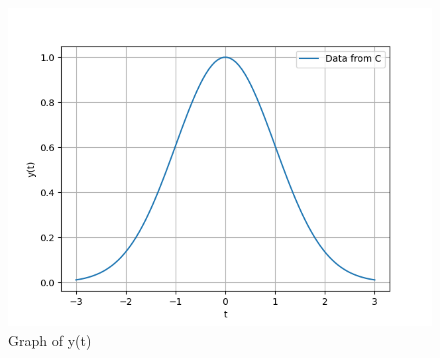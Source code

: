 \documentclass[journal,12pt,twocolumn]{IEEEtran}
\theoremstyle{remark}
\begin{document}
\begin{figure}[!h] 
    \centering
    \includegraphics[width=\columnwidth]{2023/CE/30/figs/graph_of_y(t).png}
    \caption{Graph of y(t)}
    \label{fig:Graph1_gate_CE_30}
    \end{figure}
\end{document}
